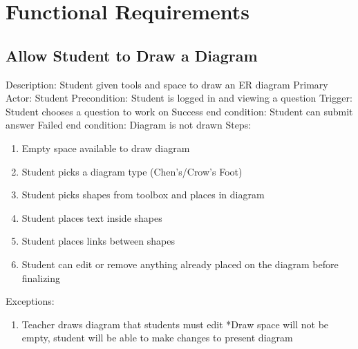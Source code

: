     \chapter{Functional Requirements}
    \section{Allow Student to Draw a Diagram}
        Description: Student given tools and space to draw an ER diagram \newline
        Primary Actor: Student \newline
        Precondition: Student is logged in and viewing a            question \newline
        Trigger: Student chooses a question to work on \newline
        Success end condition: Student can submit answer            \newline
        Failed end condition: Diagram is not drawn \newline
        \newline
        Steps:
        \begin{enumerate}
            \item{Empty space available to draw diagram}
            \item{Student picks a diagram type (Chen’s/Crow’s Foot)}
            \item{Student picks shapes from toolbox and places in           diagram}
            \item{Student places text inside shapes}
            \item{Student places links between shapes}
            \item{Student can edit or remove anything already placed on the diagram before finalizing}
        \end{enumerate}
        Exceptions:
        \begin{enumerate}
            \item{Teacher draws diagram that students must edit             \newline
                *Draw space will not be empty, student will be able to           make changes to present diagram}
        \end{enumerate}

    
